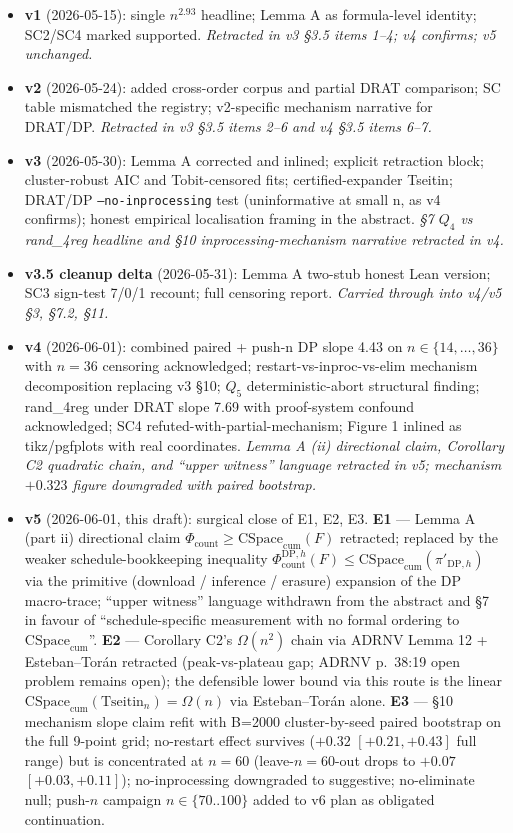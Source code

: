 \documentclass[11pt,a4paper]{article}
\theoremstyle{remark}
\begin{document}
{\begin{itemize}
\item \textbf{v1} (2026-05-15): single $n^{2.93}$ headline; Lemma A as
formula-level identity; SC2/SC4 marked supported. \emph{Retracted in v3
\S3.5 items 1--4; v4 confirms; v5 unchanged.}
\item \textbf{v2} (2026-05-24): added cross-order corpus and partial
DRAT comparison; SC table mismatched the registry; v2-specific mechanism
narrative for DRAT/DP. \emph{Retracted in v3 \S3.5 items 2--6 and v4
\S3.5 items 6--7.}
\item \textbf{v3} (2026-05-30): Lemma A corrected and inlined; explicit
retraction block; cluster-robust AIC and Tobit-censored fits;
certified-expander Tseitin; DRAT/DP \texttt{--no-inprocessing} test
(uninformative at small n, as v4 confirms); honest empirical localisation
framing in the abstract. \emph{\S7 $Q_4$ vs rand\_4reg headline and \S10
inprocessing-mechanism narrative retracted in v4.}
\item \textbf{v3.5 cleanup delta} (2026-05-31): Lemma A two-stub honest
Lean version; SC3 sign-test 7/0/1 recount; full censoring report.
\emph{Carried through into v4/v5 \S3, \S7.2, \S11.}
\item \textbf{v4} (2026-06-01): combined paired + push-n DP slope 4.43
on $n \in \{14, \ldots, 36\}$ with $n=36$ censoring acknowledged;
restart-vs-inproc-vs-elim mechanism decomposition replacing v3 \S10;
$Q_5$ deterministic-abort structural finding; rand\_4reg under DRAT slope
7.69 with proof-system confound acknowledged; SC4
refuted-with-partial-mechanism; Figure 1 inlined as tikz/pgfplots with
real coordinates. \emph{Lemma A (ii) directional claim, Corollary C2
quadratic chain, and ``upper witness'' language retracted in v5;
mechanism $+0.323$ figure downgraded with paired bootstrap.}
\item \textbf{v5} (2026-06-01, this draft): surgical close of E1, E2,
E3. \textbf{E1} --- Lemma A (part ii) directional claim
$\Phi_{\mathrm{count}} \ge \mathrm{CSpace}_{\mathrm{cum}}(F)$ retracted;
replaced by the weaker schedule-bookkeeping inequality
$\Phi_{\mathrm{count}}^{\mathrm{DP},h}(F) \le
\mathrm{CSpace}_{\mathrm{cum}}(\pi'_{\mathrm{DP},h})$ via the primitive
(download / inference / erasure) expansion of the DP macro-trace;
``upper witness'' language withdrawn from the abstract and \S7 in favour
of ``schedule-specific measurement with no formal ordering to
$\mathrm{CSpace}_{\mathrm{cum}}$''. \textbf{E2} --- Corollary C2's
$\Omega(n^2)$ chain via ADRNV Lemma 12 + Esteban--Tor\'an retracted
(peak-vs-plateau gap; ADRNV p.~38:19 open problem remains open); the
defensible lower bound via this route is the linear
$\mathrm{CSpace}_{\mathrm{cum}}(\mathrm{Tseitin}_n) = \Omega(n)$ via
Esteban--Tor\'an alone. \textbf{E3} --- \S10 mechanism slope claim refit
with B=2000 cluster-by-seed paired bootstrap on the full 9-point grid;
no-restart effect survives ($+0.32$ $[+0.21, +0.43]$ full range) but is
concentrated at $n=60$ (leave-$n=60$-out drops to $+0.07$ $[+0.03, +0.11]$);
no-inprocessing downgraded to suggestive; no-eliminate null; push-$n$
campaign $n \in \{70..100\}$ added to v6 plan as obligated continuation.
\end{itemize}

}
\end{document}
